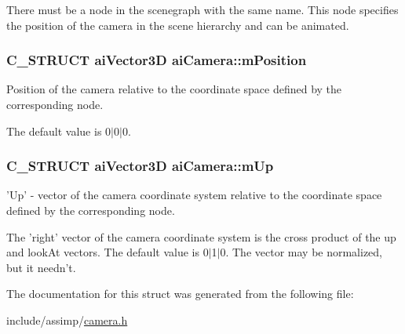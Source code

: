 \-There must be a node in the scenegraph with the same name. \-This node specifies the position of the camera in the scene hierarchy and can be animated. \hypertarget{structaiCamera_a518617ea192ca0698e748a4399e7c3a5}{
\subsubsection[{m\-Position}]{\setlength{\rightskip}{0pt plus 5cm}\-C\-\_\-\-S\-T\-R\-U\-C\-T {\bf ai\-Vector3\-D} {\bf ai\-Camera\-::m\-Position}}}\label{structaiCamera_a518617ea192ca0698e748a4399e7c3a5}
\-Position of the camera relative to the coordinate space defined by the corresponding node.

\-The default value is 0$|$0$|$0. \hypertarget{structaiCamera_a7fb42b287389b4f99c883098268d6d1a}{
\subsubsection[{m\-Up}]{\setlength{\rightskip}{0pt plus 5cm}\-C\-\_\-\-S\-T\-R\-U\-C\-T {\bf ai\-Vector3\-D} {\bf ai\-Camera\-::m\-Up}}}\label{structaiCamera_a7fb42b287389b4f99c883098268d6d1a}
'\-Up' -\/ vector of the camera coordinate system relative to the coordinate space defined by the corresponding node.

\-The 'right' vector of the camera coordinate system is the cross product of the up and look\-At vectors. \-The default value is 0$|$1$|$0. \-The vector may be normalized, but it needn't. 

\-The documentation for this struct was generated from the following file\-:\begin{DoxyCompactItemize}
\item 
include/assimp/\hyperlink{camera_8h}{camera.\-h}\end{DoxyCompactItemize}
